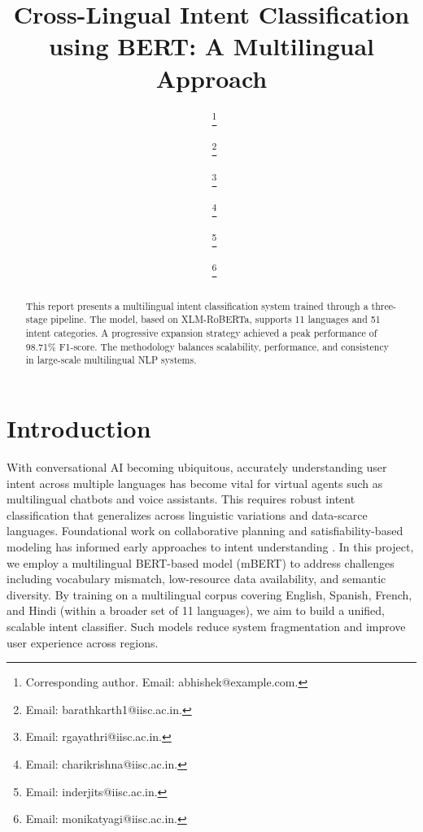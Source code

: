\documentclass{ecai}
\begin{document}

\begin{frontmatter}


\title{Cross-Lingual Intent Classification using BERT: A Multilingual Approach}

\author[A]{~\thanks{Corresponding author. Email: abhishek@example.com.}}
\author[A]{~\snm{}\thanks{Email: barathkarth1@iisc.ac.in.}}
\author[A]{~\thanks{Email: rgayathri@iisc.ac.in.}}
\author[A]{~\thanks{Email: charikrishna@iisc.ac.in.}}
\author[A]{~\thanks{Email: inderjits@iisc.ac.in.}}
\author[A]{~\thanks{Email: monikatyagi@iisc.ac.in.}}

\address[A]{Indian Institute of Science, Bengaluru}

\begin{abstract}
This report presents a multilingual intent classification system trained through a three-stage pipeline. The model, based on XLM-RoBERTa, supports 11 languages and 51 intent categories. A progressive expansion strategy achieved a peak performance of 98.71\% F1-score. The methodology balances scalability, performance, and consistency in large-scale multilingual NLP systems.
\end{abstract}

\end{frontmatter}


\section{Introduction}
With conversational AI becoming ubiquitous, accurately understanding user intent across multiple languages has become vital for virtual agents such as multilingual chatbots and voice assistants. This requires robust intent classification that generalizes across linguistic variations and data-scarce languages. Foundational work on collaborative planning and satisfiability-based modeling has informed early approaches to intent understanding \cite{grosz1996collaborative,kautz1992planning}. In this project, we employ a multilingual BERT-based model (mBERT) to address challenges including vocabulary mismatch, low-resource data availability, and semantic diversity. By training on a multilingual corpus covering English, Spanish, French, and Hindi (within a broader set of 11 languages), we aim to build a unified, scalable intent classifier. Such models reduce system fragmentation and improve user experience across regions.
\end{document}
